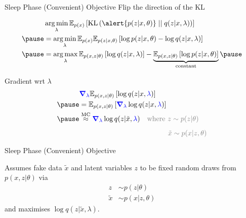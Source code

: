 \begin{frame}{Sleep Phase (Convenient) Objective}
Flip the direction of the KL
\begin{small}
\begin{equation*}
\begin{aligned}
&\argmin_{\lambda} \mathbb E_{p(x)}\left[ \KL{\alert{p(z|x, \theta)}}{q(z|x, \lambda)} \right] \\ \pause
&= \argmin_{\lambda} \mathbb E_{p(x)}\mathbb E_{p(z|x, \theta)}\left[ \log p(z|x, \theta) - \log q(z|x, \lambda) \right] \\ \pause
&= \argmax_{\lambda} \mathbb E_{p(x, z|\theta)}\left[ \log q(z|x, \lambda) \right] - \underbrace{\mathbb E_{p(x,z|\theta)}\left[ \log p(z|x, \theta) \right]}_{\text{constant}}  \pause
\end{aligned}
\end{equation*}
\end{small}
\vspace{-3pt}
Gradient wrt $\lambda$
\vspace{-2pt}
\begin{equation*}
\begin{aligned}
&\textcolor{blue}{\grad_\lambda} \mathbb E_{p(x, z|\theta)}\left[ \log q(z|x, \textcolor{blue}{\lambda}) \right] \\ \pause
&=  \mathbb E_{p(x, z|\theta)}\left[ \textcolor{blue}{\grad_\lambda}  \log q(z|x, \textcolor{blue}{\lambda}) \right]  \\ \pause
&\overset{\text{MC}}{\approx}  \textcolor{blue}{\grad_\lambda} \log q(z|\tilde{x}, \textcolor{blue}{\lambda} ) \quad \textcolor{gray}{\text{where } z \sim p(z|\theta)}\\
&\phantom{\overset{\text{MC}}{\approx}  \textcolor{blue}{\grad_\lambda} \log q(z|\tilde{x}, \textcolor{blue}{\lambda} ) \quad \text{where }} \textcolor{gray}{~\tilde x \sim p(x|z,\theta)}
\end{aligned}
\end{equation*}
\end{frame}

\begin{frame}{Sleep Phase (Convenient) Objective}

Assumes \alert{fake data} $ \tilde{x} $ and latent variables $ z $ to be fixed random draws from $ p(x,z|\theta) $ via
\begin{align*}
z &\sim p(z|\theta) \\
\tilde{x} &\sim p(x|z, \theta)
\end{align*}
and maximises $\log q(z|\tilde x, \lambda)$.

\end{frame}

